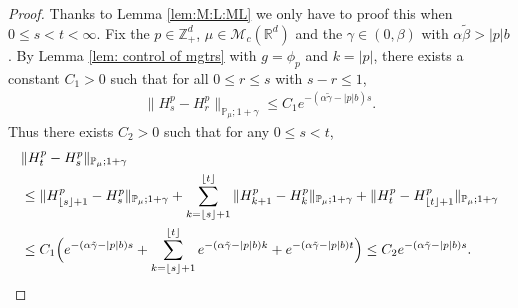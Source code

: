 \documentclass[12pt,a4paper]{amsart}
\theoremstyle{plain}
\theoremstyle{definition}
\numberwithin{equation}{section}
\begin{document}
\begin{proof}
  Thanks to Lemma \ref{lem:M:L:ML} we only have to proof this when $0\leq s < t<\infty$.
  Fix the $p\in \mathbb{Z}_+^d$, $\mu\in \mathcal M_c(\mathbb R^d)$ and the $\gamma \in (0,\beta)$ with $\alpha \tilde \beta > |p|b$.
  By Lemma \ref{lem: control of mgtrs} with $g=\phi_p$ and $k=|p|$, there exists a constant $C_1>0$ such that for all $0\leq r\leq s $ with $s-r\leq1$,
\begin{align}
  \|H^p_s-H^p_r\|_{\mathbb P_\mu; 1+\gamma}
  \leq  C_1 e^{-(\alpha\tilde \gamma-|p|b)s}.
\end{align}
Thus there exists $C_2>0$ such that for any $0\leq s<t$,
\begin{align}
	& \|H^p_t-H^p_s\|_{\mathbb{P}_{\mu};1+\gamma} \\
	& \leq \|H^p_{\lfloor s \rfloor+1}-H^p_s\|_{\mathbb{P}_{\mu};1+\gamma}+\sum_{k=\lfloor s \rfloor+1}^{\lfloor t \rfloor}\|H^p_{k+1}-H^p_{k}\|_{\mathbb{P}_{\mu};1+\gamma}+\|H^p_t-H^p_{\lfloor t \rfloor+1}\|_{\mathbb{P}_{\mu};1+\gamma} \\
	& \leq C_1 \Big(e^{-(\alpha \tilde \gamma- |p|b) s}+\sum_{k=\lfloor s \rfloor+1}^{\lfloor t \rfloor} e^{-(\alpha \tilde \gamma- |p|b) k} + e^{-(\alpha \tilde \gamma-|p|b) t}\Big)
   \leq C_2e^{-(\alpha \tilde \gamma-|p|b)s}.
   \qedhere
\end{align}	
\end{proof}
\end{document}
